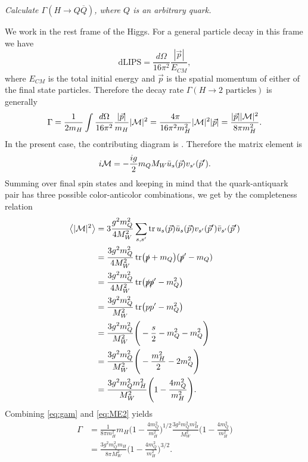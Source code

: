 {\it Calculate $\Gamma(H\to Q\overline{Q})$, where $Q$ is an arbitrary quark.}
\vspace{5mm}

We work in the rest frame of the Higgs. For a general particle decay in this
frame we have \cite[p.107]{peskin_introduction_1995}
\begin{equation}
  \text{dLIPS}=\frac{d\Omega}{16\pi^2}\frac{|\vec{p}|}{E_{CM}},
\end{equation}
where $E_{CM}$ is the total initial energy and $\vec{p}$ is the spatial
momentum of either of the final state particles. Therefore the decay rate
$\Gamma(H\to\text{2 particles})$ is generally
\begin{equation}
  \label{eq:gam}
  \Gamma=\frac{1}{2m_H}\int\frac{d\Omega}{16\pi^2}
             \frac{|\vec{p}|}{m_H}|\mathcal{M}|^2
        =\frac{4\pi}{16\pi^2 m_H^2}|\mathcal{M}|^2|\vec{p}|
        =\frac{|\vec{p}||\mathcal{M}|^2}{8\pi m_H^2}.
\end{equation}
In the present case, the contributing diagram is . Therefore the matrix
element is
\begin{equation}
  i\mathcal{M}=-\frac{ig}{2}{m_Q}{M_W}\bar{u}_s(\vec{p})v_{s'}(\vec{p}').
\end{equation}
Summing over final spin states and keeping in mind that the quark-antiquark
pair has three possible color-anticolor combinations, we get by the
completeness relation
\begin{equation}
  \label{eq:ME2}
  \begin{aligned}
    \left< |\mathcal{M}|^2 \right>&=3\frac{g^2 m_Q^2}{4M_W^2}\sum\limits_{s,s'}
      \tr u_s(\vec{p})\bar{u}_s(\vec{p})
          v_{s'}(\vec{p}')\bar{v}_{s'}(\vec{p}') \\
    &=\frac{3g^2 m_Q^2}{4M_W^2}\tr(\slashed{p}+m_Q)(\slashed{p}'-m_Q) \\
    &=\frac{3g^2 m_Q^2}{4M_W^2}\tr(\slashed{p}\slashed{p}'-m_Q^2) \\
    &=\frac{3g^2 m_Q^2}{M_W^2}\tr(pp'-m_Q^2) \\
    &=\frac{3g^2 m_Q^2}{M_W^2}\Bigg(-\frac{s}{2}-m_Q^2-m_Q^2\Bigg) \\
    &=\frac{3g^2 m_Q^2}{M_W^2}\Bigg(-\frac{m_H^2}{2}-2m_Q^2\Bigg) \\
    &=\frac{3g^2 m_Q^2 m_H^2}{M_W^2}\Bigg(1-\frac{4m_Q^2}{m_H^2}\Bigg).
  \end{aligned}
\end{equation}
Combining \eqref{eq:gam} and \eqref{eq:ME2} yields
\begin{equation}
  \label{eq:gamQ}
  \begin{aligned}
    \Gamma&=\frac{1}{8\pi m_H^2}{m_H}\Bigg(1-\frac{4m_Q^2}{m_H^2}\Bigg)^{1/2}
            \frac{3g^2m_Q^2m_H^2}{M_W^2}\Bigg(1-\frac{4m_Q^2}{m_H^2}\Bigg)\\
          &=\frac{3g^2m_Q^2m_H}{8\pi M_W^2}
               \Bigg(1-\frac{4m_Q^2}{m_H^2}\Bigg)^{3/2}.
  \end{aligned}
\end{equation}

